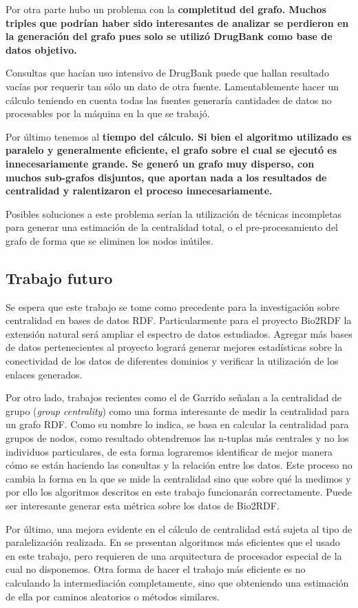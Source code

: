 Por otra parte hubo un problema con la \bf{completitud del grafo.}
Muchos triples que podrían haber sido interesantes de analizar se perdieron en
la generación del grafo pues solo se utilizó DrugBank como base de datos
objetivo.

Consultas que hacían uso intensivo de DrugBank puede que hallan resultado vacías
por requerir tan sólo un dato de otra fuente.
Lamentablemente hacer un cálculo teniendo en cuenta todas las fuentes generaría
cantidades de datos no procesables por la máquina en la que se trabajó.

Por último tenemos al \bf{tiempo del cálculo.}
Si bien el algoritmo utilizado es paralelo y generalmente eficiente, el grafo
sobre el cual se ejecutó es innecesariamente grande. 
Se generó un grafo muy disperso, con muchos sub-grafos disjuntos, que aportan
nada a los resultados de centralidad y ralentizaron el proceso innecesariamente.

Posibles soluciones a este problema serían la utilización de técnicas
incompletas para generar una estimación de la centralidad total, o el
pre-procesamiento del grafo de forma que se eliminen los nodos inútiles.

\subsection{Trabajo futuro}\label{sec:con:tf}
Se espera que este trabajo se tome como precedente para la investigación sobre
centralidad en bases de datos RDF.
Particularmente para el proyecto Bio2RDF la extensión natural será ampliar el
espectro de datos estudiados. Agregar más bases de datos pertenecientes al
proyecto logrará generar mejores estadísticas sobre la conectividad de los datos
de diferentes dominios y verificar la utilización de los enlaces generados.

Por otro lado, trabajos recientes como el de Garrido 
\etal\cite{garrido2016group} señalan a la centralidad de grupo (\emph{group
centrality}) como una forma interesante de medir la centralidad para un grafo
RDF.
Como su nombre lo indica, se basa en calcular la centralidad para
grupos de nodos, como resultado obtendremos las n-tuplas más centrales y no los
individuos particulares, de esta forma lograremos identificar de mejor manera
cómo se están haciendo las consultas y la relación entre los datos.
Este proceso no cambia la forma en la que se mide la
centralidad sino que sobre qué la medimos y por ello los algoritmos descritos
en este trabajo funcionarán correctamente.
Puede ser interesante generar esta métrica sobre los datos de Bio2RDF.

Por último, una mejora evidente en el cálculo de centralidad está sujeta al tipo
de paralelización realizada. En \cite{madduri2009faster} se presentan algoritmos
más eficientes que el usado en este trabajo, pero requieren de una arquitectura
de procesador especial de la cual no disponemos.
Otra forma de hacer el trabajo más eficiente es no calculando la intermediación
completamente, sino que obteniendo una estimación de ella por caminos
aleatorios o métodos similares.
